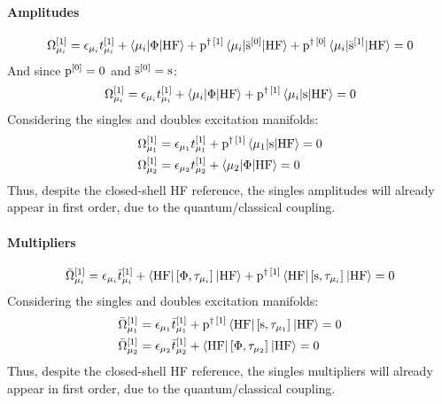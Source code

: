 \paragraph*{Amplitudes}
\begin{equation}
  \Omega_{\mu_i}^{[1]} = \epsilon_{\mu_i}t_{\mu_i}^{[1]}
  + \braket{\mu_i | \Phi | \mathrm{HF}}
  + \mathrm{p}^{\dagger\,[1]}\braket{\mu_i | \bar{\mathrm{s}}^{[0]} | \mathrm{HF}}
  + \mathrm{p}^{\dagger\,[0]}\braket{\mu_i | \bar{\mathrm{s}}^{[1]}  | \mathrm{HF}}
  = 0
\end{equation}
And since $\mathrm{p}^{[0]} = 0$ and $\bar{\mathrm{s}}^{[0]} = \mathrm{s}$:
\begin{equation}\label{eq:1st-order-amp}
  \Omega_{\mu_i}^{[1]} = \epsilon_{\mu_i}t_{\mu_i}^{[1]}
  + \braket{\mu_i | \Phi | \mathrm{HF}}
  + \mathrm{p}^{\dagger\,[1]}\braket{\mu_i | \mathrm{s} | \mathrm{HF}}
  = 0
\end{equation}
Considering the singles and doubles excitation manifolds:
\begin{subequations}
  \begin{align}
  \Omega_{\mu_1}^{[1]} &= \epsilon_{\mu_1}t_{\mu_1}^{[1]}
  + \mathrm{p}^{\dagger\,[1]}\braket{\mu_1 | \mathrm{s} | \mathrm{HF}}
  = 0 \\
  \Omega_{\mu_2}^{[1]} &= \epsilon_{\mu_2}t_{\mu_2}^{[1]}
  + \braket{\mu_2 | \Phi | \mathrm{HF}}
  = 0
  \end{align}
\end{subequations}
Thus, despite the closed-shell \acs{HF} reference, the singles
amplitudes will already appear in first order, due to the
quantum/classical coupling.

\paragraph*{Multipliers}
  \begin{equation}\label{eq:1st-order-mult}
    \bar{\Omega}_{\mu_i}^{[1]} =
      \epsilon_{\mu_i}\bar{t}_{\mu_i}^{[1]}
      + \braket{\mathrm{HF} | \left[ \Phi, \tau_{\mu_i} \right]^{} | \mathrm{HF}}
      + \mathrm{p}^{\dagger\,[1]}\braket{\mathrm{HF} |
      \left[ \mathrm{s}, \tau_{\mu_i} \right]^{} | \mathrm{HF}} =0
  \end{equation}
Considering the singles and doubles excitation manifolds:
\begin{subequations}
  \begin{align}
    \bar{\Omega}_{\mu_1}^{[1]} &= \epsilon_{\mu_1}\bar{t}_{\mu_1}^{[1]}
      + \mathrm{p}^{\dagger\,[1]}\braket{\mathrm{HF} |
      \left[ \mathrm{s}, \tau_{\mu_1} \right]^{} | \mathrm{HF}}
  = 0 \\
    \bar{\Omega}_{\mu_2}^{[1]} &= \epsilon_{\mu_2}\bar{t}_{\mu_2}^{[1]}
      + \braket{\mathrm{HF} | \left[ \Phi, \tau_{\mu_2} \right]^{} | \mathrm{HF}}
  = 0
  \end{align}
\end{subequations}
Thus, despite the closed-shell \acs{HF} reference, the singles
multipliers will already appear in first order, due to the
quantum/classical coupling.
